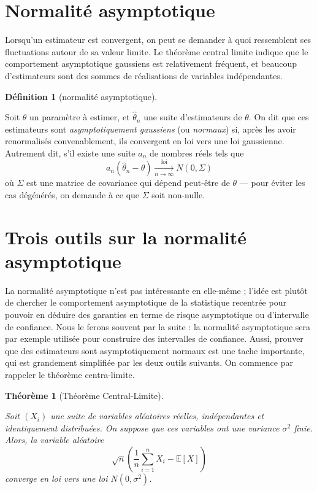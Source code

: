 \documentclass[
  10,
  letterpaper,
  DIV=11,
  numbers=noendperiod]{scrreport}
\theoremstyle{plain}
\newtheorem{theorem}{Théorème}[chapter]
\theoremstyle{definition}
\theoremstyle{plain}
\theoremstyle{definition}
\newtheorem{definition}{Définition}[chapter]
\theoremstyle{definition}
\theoremstyle{plain}
\theoremstyle{remark}
\begin{document}
\hypertarget{normalituxe9-asymptotique}{%
\section{Normalité asymptotique}\label{normalituxe9-asymptotique}}

Lorsqu'un estimateur est convergent, on peut se demander à quoi
ressemblent ses fluctuations autour de sa valeur limite. Le théorème
central limite indique que le comportement asymptotique gaussiens est
relativement fréquent, et beaucoup d'estimateurs sont des sommes de
réalisations de variables indépendantes.

\begin{definition}[normalité
asymptotique]\protect\hypertarget{def-normasymp}{}\label{def-normasymp}

Soit \(\theta\) un paramètre à estimer, et \(\hat{\theta}_n\) une suite
d'estimateurs de \(\theta\). On dit que ces estimateurs sont
\emph{asymptotiquement gaussiens} (ou \emph{normaux}) si, après les
avoir renormalisés convenablement, ils convergent en loi vers une loi
gaussienne. Autrement dit, s'il existe une suite \(a_n\) de nombres
réels tels que
\[ a_n(\hat{\theta}_n - \theta) \xrightarrow[n\to \infty]{\text{loi}} N(0,\Sigma)\]
où \(\Sigma\) est une matrice de covariance qui dépend peut-être de
\(\theta\) --- pour éviter les cas dégénérés, on demande à ce que
\(\Sigma\) soit non-nulle.

\end{definition}

\hypertarget{trois-outils-sur-la-normalituxe9-asymptotique}{%
\section{Trois outils sur la normalité
asymptotique}\label{trois-outils-sur-la-normalituxe9-asymptotique}}

La normalité asymptotique n'est pas intéressante en elle-même ; l'idée
est plutôt de chercher le comportement asymptotique de la statistique
recentrée pour pouvoir en déduire des garanties en terme de risque
asymptotique ou d'intervalle de confiance. Nous le ferons souvent par la
suite : la normalité asymptotique sera par exemple utilisée pour
construire des intervalles de confiance. Aussi, prouver que des
estimateurs sont asymptotiquement normaux est une tache importante, qui
est grandement simplifiée par les deux outils suivants. On commence par
rappeler le théorème centra-limite.

\begin{theorem}[Théorème
Central-Limite]\protect\hypertarget{thm-tcl}{}\label{thm-tcl}

Soit \((X_i)\) une suite de variables aléatoires réelles, indépendantes
et identiquement distribuées. On suppose que ces variables ont une
variance \(\sigma^2\) finie. Alors, la variable aléatoire
\[ \sqrt{n}\left(\frac{1}{n}\sum_{i=1}^n X_i - \mathbb{E}[X]\right)\]
converge en loi vers une loi \(N(0,\sigma^2)\).

\end{theorem}
\end{document}
